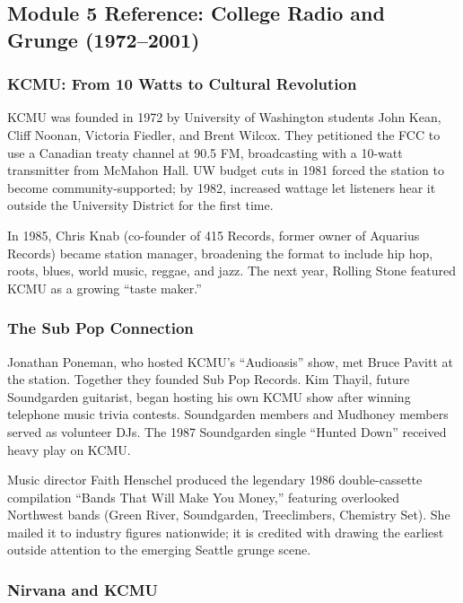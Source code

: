 \documentclass[11pt,letterpaper]{article}
\begin{document}
\subsection{Module 5 Reference: College Radio and Grunge (1972--2001)}

\subsubsection{KCMU: From 10 Watts to Cultural Revolution}

KCMU was founded in 1972 by University of Washington students John Kean, Cliff Noonan, Victoria Fiedler, and Brent Wilcox. They petitioned the FCC to use a Canadian treaty channel at 90.5 FM, broadcasting with a 10-watt transmitter from McMahon Hall. UW budget cuts in 1981 forced the station to become community-supported; by 1982, increased wattage let listeners hear it outside the University District for the first time.

In 1985, Chris Knab (co-founder of 415 Records, former owner of Aquarius Records) became station manager, broadening the format to include hip hop, roots, blues, world music, reggae, and jazz. The next year, Rolling Stone featured KCMU as a growing ``taste maker.''

\subsubsection{The Sub Pop Connection}

Jonathan Poneman, who hosted KCMU's ``Audioasis'' show, met Bruce Pavitt at the station. Together they founded Sub Pop Records. Kim Thayil, future Soundgarden guitarist, began hosting his own KCMU show after winning telephone music trivia contests. Soundgarden members and Mudhoney members served as volunteer DJs. The 1987 Soundgarden single ``Hunted Down'' received heavy play on KCMU.

Music director Faith Henschel produced the legendary 1986 double-cassette compilation ``Bands That Will Make You Money,'' featuring overlooked Northwest bands (Green River, Soundgarden, Treeclimbers, Chemistry Set). She mailed it to industry figures nationwide; it is credited with drawing the earliest outside attention to the emerging Seattle grunge scene.

\subsubsection{Nirvana and KCMU}
\end{document}
